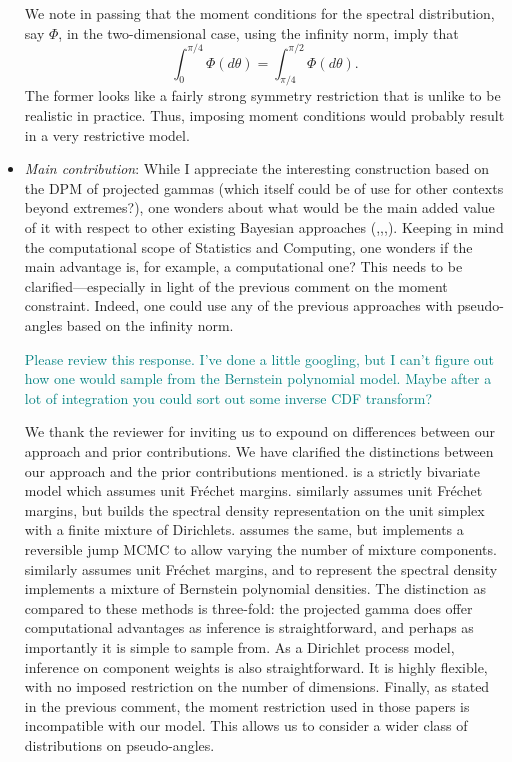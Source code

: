 \documentclass[10pt]{article}
\newcommand{\comment}[1]{\textcolor{teal}{#1}}
\begin{document}
\begin{itemize}
We note in passing that the moment conditions for the spectral distribution, say 
    $\Phi$, in the two-dimensional case, using the infinity norm, imply that 
    \[
        \int_0^{\pi/4} \Phi(d\theta) = \int_{\pi/4}^{\pi/2}
    \Phi(d\theta).
    \]
    The former looks like a fairly strong symmetry restriction that is unlike to 
    be realistic in practice. Thus, imposing moment conditions would probably 
    result in a very restrictive model.

\item \emph{Main contribution}: While I appreciate the interesting construction 
    based on the DPM of projected gammas (which itself could be of use for other 
    contexts beyond extremes?), one wonders about what would be the main added 
    value of it with respect to other existing Bayesian approaches 
    (\cite{boldi2007},\cite{guillotte2011},\cite{SaNa2014},\cite{hanson2017}).
    Keeping in mind the computational scope of Statistics and Computing, one 
    wonders if the main advantage is, for example, a computational one? This 
    needs to be clarified—especially in light of the previous comment on the 
    moment constraint. Indeed, one could use any of the previous approaches with 
    pseudo-angles based on the infinity norm.

\comment{Please review this response.  I've done a little googling, but I can't figure
    out how one would sample from the Bernstein polynomial model.  Maybe after a lot of
    integration you could sort out some inverse CDF transform?}
    
We thank the reviewer for inviting us to expound on differences between our approach
    and prior contributions. We have clarified the distinctions between our approach 
    and the prior contributions
    mentioned.  \cite{guillotte2011} is a strictly bivariate model which assumes
    unit Fr\'{e}chet margins.  \cite{boldi2007} similarly assumes unit Fr\'{e}chet
    margins, but builds the spectral density representation on the unit simplex with
    a finite mixture of Dirichlets.  \cite{SaNa2014} assumes the same, but implements
    a reversible jump MCMC to allow varying the number of mixture components.
    \cite{hanson2017} similarly assumes unit Fr\'{e}chet margins, and to represent
    the spectral density implements a mixture of Bernstein polynomial densities.
    The distinction as compared to these methods is three-fold: the projected gamma does
    offer computational advantages as inference is straightforward, and perhaps as 
    importantly it is simple to sample from.  As a Dirichlet process model, inference
    on component weights is also straightforward.  It is highly flexible, with no
    imposed restriction on the number of dimensions.  Finally, as stated in the previous
    comment, the moment restriction used in those papers is incompatible with our model.
    This allows us to consider a wider class of distributions on pseudo-angles.
    

\end{itemize}
\end{document}
